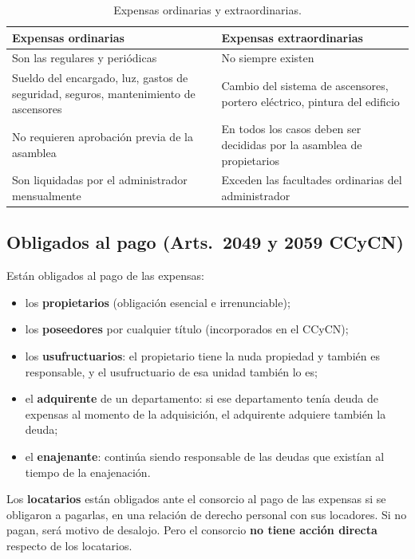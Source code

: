 \documentclass[12pt,oneside]{book}
\begin{document}
\begin{table}[H]
\centering
\begin{tabularx}{\textwidth}{
    >{\raggedright\arraybackslash}X
    >{\raggedright\arraybackslash}X
}
\toprule
\textbf{Expensas ordinarias} & \textbf{Expensas extraordinarias} \\
\midrule
Son las regulares y periódicas & No siempre existen \\
Sueldo del encargado, luz, gastos de seguridad, seguros, mantenimiento de ascensores & Cambio del sistema de ascensores, portero eléctrico, pintura del edificio \\
No requieren aprobación previa de la asamblea & En todos los casos deben ser decididas por la asamblea de propietarios \\
Son liquidadas por el administrador mensualmente & Exceden las facultades ordinarias del administrador \\
\bottomrule
\end{tabularx}
\caption{Expensas ordinarias y extraordinarias.}
\end{table}

\subsection{Obligados al pago (Arts.~2049 y 2059 CCyCN)}

Están obligados al pago de las expensas:

\begin{itemize}
    \item los \textbf{propietarios} (obligación esencial e irrenunciable);
    \item los \textbf{poseedores} por cualquier título (incorporados en el CCyCN);
    \item los \textbf{usufructuarios}: el propietario tiene la nuda propiedad y también es responsable, y el usufructuario de esa unidad también lo es;
    \item el \textbf{adquirente} de un departamento: si ese departamento tenía deuda de expensas al momento de la adquisición, el adquirente adquiere también la deuda;
    \item el \textbf{enajenante}: continúa siendo responsable de las deudas que existían al tiempo de la enajenación.
\end{itemize}

\begin{important}
Los \textbf{locatarios} están obligados ante el consorcio al pago de las expensas si se obligaron a pagarlas, en una relación de derecho personal con sus locadores. Si no pagan, será motivo de desalojo. Pero el consorcio \textbf{no tiene acción directa} respecto de los locatarios.
\end{important}
\end{document}
